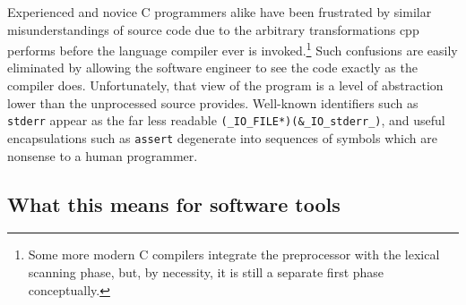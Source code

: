 \documentclass{article}
\newcommand{\Cpp}{\mbox{\textsf{cpp}}}
\newcommand{\C}{\mbox{C}}
\begin{document}
Experienced and novice \C{} programmers alike have been frustrated by
similar misunderstandings of source code due to the arbitrary
transformations \Cpp{} performs before the language compiler ever is
invoked.\footnote{Some more modern \C{} compilers integrate the
  preprocessor with the lexical scanning phase, but, by necessity, it is
  still a separate first phase conceptually.}  Such confusions are
easily eliminated by allowing the software engineer to see the code
exactly as the compiler does.  Unfortunately, that view of the program
is a level of abstraction lower than the unprocessed source provides.
Well-known identifiers such as \texttt{stderr} appear as the far less
readable \texttt{(\_IO\_FILE*)(\&\_IO\_stderr\_)},
and useful encapsulations such as \texttt{assert} degenerate into
sequences of symbols which are nonsense to a human programmer.


\subsection{What this means for software tools}
\end{document}
